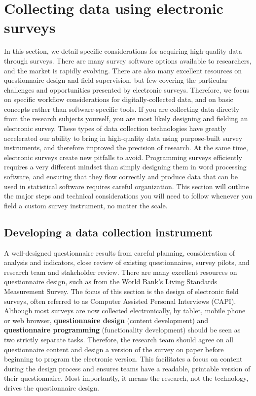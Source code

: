 \section{Collecting data using electronic surveys}
In this section, we detail specific considerations
for acquiring high-quality data through surveys.
There are many survey software options available to researchers,
and the market is rapidly evolving.
There are also many excellent resources on questionnaire design and field supervision,
but few covering the particular challenges and opportunities presented by electronic surveys.
Therefore, we focus on specific workflow considerations for digitally-collected data,
and on basic concepts rather than software-specific tools.
If you are collecting data directly from the research subjects yourself,
you are most likely designing and fielding an electronic survey.
These types of data collection technologies
have greatly accelerated our ability to bring in high-quality data
using purpose-built survey instruments,
and therefore improved the precision of research.
At the same time, electronic surveys create new pitfalls to avoid.
Programming surveys efficiently requires a very different mindset
than simply designing them in word processing software,
and ensuring that they flow correctly and produce data
that can be used in statistical software requires careful organization.
This section will outline the major steps and technical considerations
you will need to follow whenever you field a custom survey instrument,
no matter the scale.

\subsection{Developing a data collection instrument}

A well-designed questionnaire results from careful planning,
consideration of analysis and indicators,
close review of existing questionnaires,
survey pilots, and research team and stakeholder review.
There are many excellent resources on questionnaire design,
such as from the World Bank's Living Standards Measurement Survey.\cite{glewwe2000designing}
The focus of this section is the design of electronic field surveys,
often referred to as Computer Assisted Personal Interviews (CAPI).
Although most surveys are now collected electronically, by tablet, mobile phone or web browser,
\textbf{questionnaire design}
(content development) and \textbf{questionnaire programming}
(functionality development) should be seen as two strictly separate tasks.
Therefore, the research team should agree on all questionnaire content
and design a version of the survey on paper
before beginning to program the electronic version.
This facilitates a focus on content during the design process
and ensures teams have a readable, printable version of their questionnaire.
Most importantly, it means the research, not the technology,
drives the questionnaire design.

